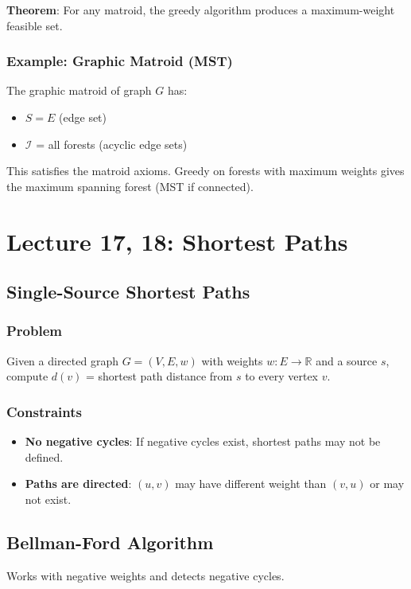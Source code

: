 \documentclass[11pt]{article}
\begin{document}
{{{\textbf{Theorem}: For any matroid, the greedy algorithm produces a maximum-weight feasible set.

\subsubsection*{Example: Graphic Matroid (MST)}
The graphic matroid of graph $G$ has:
\begin{itemize}
\item $S = E$ (edge set)
\item $\mathcal{I}$ = all forests (acyclic edge sets)
\end{itemize}

This satisfies the matroid axioms. Greedy on forests with maximum weights gives the maximum spanning forest (MST if connected).

\section{Lecture 17, 18: Shortest Paths}

\subsection*{Single-Source Shortest Paths}

\subsubsection*{Problem}
Given a directed graph $G = (V, E, w)$ with weights $w: E \to \mathbb{R}$ and a source $s$, compute $d(v)$ = shortest path distance from $s$ to every vertex $v$.

\subsubsection*{Constraints}
\begin{itemize}
\item \textbf{No negative cycles}: If negative cycles exist, shortest paths may not be defined.
\item \textbf{Paths are directed}: $(u, v)$ may have different weight than $(v, u)$ or may not exist.
\end{itemize}

\subsection*{Bellman-Ford Algorithm}

Works with negative weights and detects negative cycles.

}}}
\end{document}
